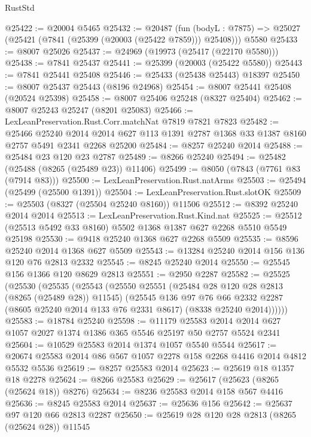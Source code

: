 \begin{lexlean}{RustStd}
\begin{coremodule}
{\begin{coremodule}
{{{{{{{{{{{{{{{{{{{{{{{{{{{{{{{{{{{{{{{{{{{{{{{{{{{{{{@25422 := @20004 @5465
@25432 := @20487
    (fun (bodyL : @7875) => @25027 (@25421 (@7841 (@25399 (@20003 (@25422 @7859))) @25408)))
    @5580
@25433 := @8007 @25026
@25437 := @24969 (@19973 (@25417 (@22170 @5580)))
@25438 := @7841 @25437
@25441 := @25399 (@20003 (@25422 @5580))
@25443 := @7841 @25441 @25408
@25446 := @25433 (@25438 @25443) @18397
@25450 := @8007 @25437 @25443 (@8196 @24968)
@25454 := @8007 @25441 @25408 (@20524 @25398)
@25458 := @8007 @25406 @25248 (@8327 @25404)
@25462 := @8007 @25243 @25247 (@8201 @25083)
@25466 := LexLeanPreservation.Rust.Corr.matchNat @7819 @7821 @7823
@25482 := @25466
    @25240
    @2014
    @2014
    @627
    @113
    @1391
    @2787
    @1368
    @33
    @1387
    @8160
    @2757
    @5491
    @2341
    @2268
    @25200
@25484 := @8257 @25240 @2014
@25488 := @25484 @23 @120 @23 @2787
@25489 := @8266 @25240
@25494 := @25482 (@25488 (@8265 (@25489 @23)) @11406)
@25499 := @8050 (@7843 (@7761 @83 (@7914 @83)))
@25500 := LexLeanPreservation.Rust.natArms
@25503 := @25494 (@25499 (@25500 @1391))
@25504 := LexLeanPreservation.Rust.slotOK
@25509 := @25503 (@8327 (@25504 @25240 @8160)) @11506
@25512 := @8392 @25240 @2014 @2014
@25513 := LexLeanPreservation.Rust.Kind.nat
@25525 := @25512 (@25513 @5492 @33 @8160) @5502 @1368 @1387 @627 @2268 @5510 @5549 @25198
@25530 := @9418 @25240 @1368 @627 @2268 @5509
@25535 := @8596 @25240 @2014 @1368 @627 @5509
@25543 := @13284 @25240 @2014 @156 @136 @120 @76 @2813 @2332
@25545 := @8245 @25240 @2014
@25550 := @25545 @156 @1366 @120 @8629 @2813
@25551 := @2950 @2287
@25582 := @25525
    (@25530
      (@25535
        (@25543
          (@25550
            @25551
            (@25484 @28 @120 @28 @2813 (@8265 (@25489 @28)) @11545)
            (@25545
              @136
              @97
              @76
              @66
              @2332
              @2287
              (@8605 @25240 @2014 @133 @76 @2331 @8617)
              (@8338 @25240 @2014))))))
@25583 := @18784 @25240
@25598 := @11179
    @25583
    @2014
    @2014
    @627
    @1057
    @2027
    @1374
    @1386
    @365
    @5546
    @25197
    @50
    @2757
    @5524
    @2341
@25604 := @10529 @25583 @2014 @1374 @1057 @5540 @5544
@25617 := @20674 @25583 @2014 @86 @567 @1057 @2278 @158 @2268 @4416 @2014 @4812 @5532 @5536
@25619 := @8257 @25583 @2014
@25623 := @25619 @18 @1357 @18 @2278
@25624 := @8266 @25583
@25629 := @25617 (@25623 (@8265 (@25624 @18)) @8276)
@25634 := @8236 @25583 @2014 @158 @567 @4416
@25636 := @8245 @25583 @2014
@25637 := @25636 @156
@25642 := @25637 @97 @120 @66 @2813 @2287
@25650 := @25619 @28 @120 @28 @2813 (@8265 (@25624 @28)) @11545
}}}}}}}}}}}}}}}}}}}}}}}}}}}}}}}}}}}}}}}}}}}}}}}}}}}}}}
\end{coremodule}}
\end{coremodule}
\end{lexlean}
